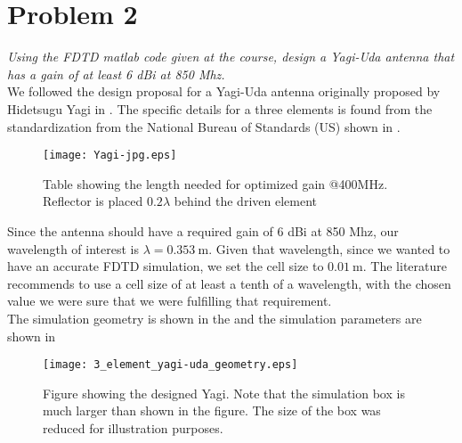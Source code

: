 \section{Problem 2}
\textit{Using the FDTD matlab code given at the course, design a Yagi-Uda antenna that has a gain of at least 6 dBi at 850 Mhz.}\\

We followed the design proposal for a Yagi-Uda antenna originally proposed by Hidetsugu Yagi in \cite{lit:YAGI}. The specific details for a three elements is found from the standardization from the National Bureau of Standards (US) shown in .

\begin{figure}[!h]
  \centering
  \texttt{[image: Yagi-jpg.eps]}
  \caption{Table showing the length needed for optimized gain @400MHz. Reflector is placed $0.2\lambda$ behind the driven element \cite[p.~7]{lit:NBS}}
  \label{tab:Yagi-jpg}
\end{figure}

Since the antenna should have a required gain of 6 dBi at 850 Mhz, our wavelength of interest is $\lambda = \SI{0.353}{\meter}$. Given that wavelength, since we wanted to have an accurate FDTD simulation, we set the cell size to $\SI{0.01}{\meter}$. The literature recommends to use a cell size of at least a tenth of a wavelength, with the chosen value we were sure that we were fulfilling that requirement.\\

The simulation geometry is shown in the  and the simulation parameters are shown in 

\begin{figure}[!h]
  \centering
  \texttt{[image: 3\_element\_yagi-uda\_geometry.eps]}
  \caption{Figure showing the designed Yagi. Note that the simulation box is much larger than shown in the figure. The size of the box was reduced for illustration purposes.}
  \label{fig:3_element_yagi-uda_geometry}
\end{figure}


